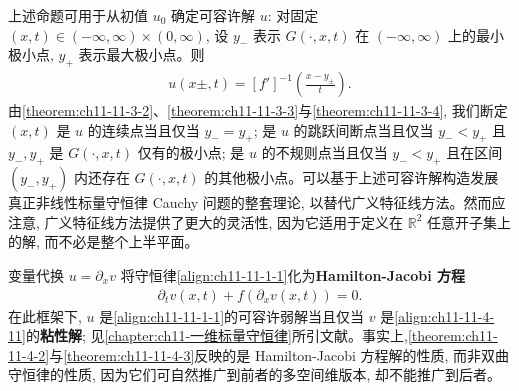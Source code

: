 \documentclass[../../main.tex]{subfiles}
\begin{document}
上述命题可用于从初值 $u_0$ 确定可容许解 $u$: 对固定 $(x,t)\in(-\infty,\infty)\times(0,\infty)$, 设 $y_-$ 表示 $G(\cdot,x,t)$ 在 $(-\infty,\infty)$ 上的最小极小点, $y_+$ 表示最大极小点。则
\begin{align}
u(x\pm,t)=[f']^{-1}\left(\frac{x-y_\pm}{t}\right).\label{align:ch11-11-4-10}
\end{align}
由\cref{theorem:ch11-11-3-2}、\cref{theorem:ch11-11-3-3}与\cref{theorem:ch11-11-3-4}, 我们断定 $(x,t)$ 是 $u$ 的连续点当且仅当 $y_-=y_+$; 是 $u$ 的跳跃间断点当且仅当 $y_-<y_+$ 且 $y_-,y_+$ 是 $G(\cdot,x,t)$ 仅有的极小点; 是 $u$ 的不规则点当且仅当 $y_-<y_+$ 且在区间 $(y_-,y_+)$ 内还存在 $G(\cdot,x,t)$ 的其他极小点。可以基于上述可容许解构造发展真正非线性标量守恒律 Cauchy 问题的整套理论, 以替代广义特征线方法。然而应注意, 广义特征线方法提供了更大的灵活性, 因为它适用于定义在 $\mathbb{R}^2$ 任意开子集上的解, 而不必是整个上半平面。

变量代换 $u=\partial_x v$ 将守恒律\eqref{align:ch11-11-1-1}化为\textbf{Hamilton-Jacobi 方程}
\begin{align}
\partial_t v(x,t)+f(\partial_x v(x,t))=0.\label{align:ch11-11-4-11}
\end{align}
在此框架下, $u$ 是\eqref{align:ch11-11-1-1}的可容许弱解当且仅当 $v$ 是\eqref{align:ch11-11-4-11}的\textbf{粘性解}; 见\cref{chapter:ch11-一维标量守恒律}所引文献。事实上,\cref{theorem:ch11-11-4-2}与\cref{theorem:ch11-11-4-3}反映的是 Hamilton-Jacobi 方程解的性质, 而非双曲守恒律的性质, 因为它们可自然推广到前者的多空间维版本, 却不能推广到后者。
\end{document}
